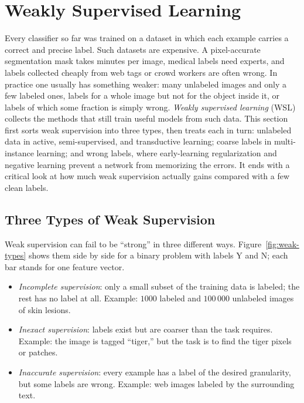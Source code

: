 \section{Weakly Supervised Learning}
\label{sec:weakly}

Every classifier so far was trained on a dataset in which each example carries
a correct and precise label. Such datasets are expensive. A pixel-accurate
segmentation mask takes minutes per image, medical labels need experts, and
labels collected cheaply from web tags or crowd workers are often wrong. In
practice one usually has something weaker: many unlabeled images and only a
few labeled ones, labels for a whole image but not for the object inside it,
or labels of which some fraction is simply wrong. \emph{Weakly supervised
learning} (WSL) collects the methods that still train useful models from such
data. This section first sorts weak supervision into three types, then treats
each in turn: unlabeled data in active, semi-supervised, and transductive
learning; coarse labels in multi-instance learning; and wrong labels, where
early-learning regularization and negative learning prevent a network from
memorizing the errors. It ends with a critical look at how much weak
supervision actually gains compared with a few clean labels.

\subsection{Three Types of Weak Supervision}

Weak supervision can fail to be ``strong'' in three different ways.
Figure~\ref{fig:weak-types} shows them side by side for a binary problem with
labels \textsf{Y} and \textsf{N}; each bar stands for one feature vector.

\begin{itemize}
  \item \emph{Incomplete supervision}: only a small subset of the training
    data is labeled; the rest has no label at all. Example: $1000$ labeled
    and $100\,000$ unlabeled images of skin lesions.
  \item \emph{Inexact supervision}: labels exist but are coarser than the
    task requires. Example: the image is tagged ``tiger,'' but the task is to
    find the tiger pixels or patches.
  \item \emph{Inaccurate supervision}: every example has a label of the
    desired granularity, but some labels are wrong. Example: web images
    labeled by the surrounding text.
\end{itemize}

